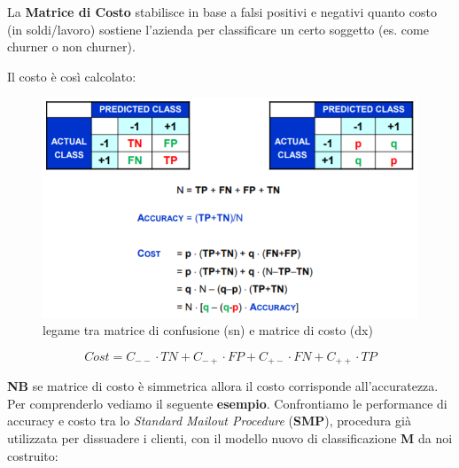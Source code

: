\begin{defn}
	La \textbf{Matrice di Costo} stabilisce in base a falsi positivi e negativi quanto costo (in soldi/lavoro) sostiene l'azienda per classificare un certo soggetto (es. come churner o non churner). 
	
	Il costo è così calcolato:
	\begin{figure}[H]
		\centering
		\includegraphics[height=0.55 \linewidth]{classification/pict/matr_costo.png}
		\caption{legame tra matrice di confusione (sn) e matrice di costo (dx)}
	\end{figure}
	\[Cost = C_{--} \cdot TN + C_{-+} \cdot FP + C_{+-} \cdot FN + C_{++} \cdot TP\]
\end{defn}
\textbf{NB} se matrice di costo \`e simmetrica allora il costo corrisponde all'accuratezza.\\

Per comprenderlo vediamo il seguente \textbf{esempio}. Confrontiamo le performance di accuracy e costo tra lo \textit{Standard Mailout Procedure} (\textbf{SMP}), procedura già utilizzata per dissuadere i clienti, con il modello nuovo di classificazione \textbf{M} da noi costruito:

